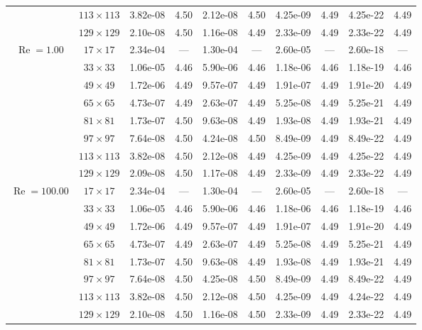\documentclass[preprint, 12pt]{elsarticle}
\begin{document}
{\begin{center}
\begin{table}[H]
{\begin{tabular*}{\textwidth}{@{\extracolsep\fill}cccccccccc@{}}
    & $113\times 113$ & 3.82e-08 & 4.50 & 2.12e-08 & 4.50 & 4.25e-09 & 4.49 & 4.25e-22 & 4.49 \\
    & $129\times 129$ & 2.10e-08 & 4.50 & 1.16e-08 & 4.49 & 2.33e-09 & 4.49 & 2.33e-22 & 4.49 \\
    \hline\hline
    \multirow{7}{*}{$\operatorname{Re}=1.00$} & $17\times 17$ & 2.34e-04 & --- & 1.30e-04 & --- & 2.60e-05 & --- & 2.60e-18 & --- \\
    & $33\times 33$ & 1.06e-05 & 4.46 & 5.90e-06 & 4.46 & 1.18e-06 & 4.46 & 1.18e-19 & 4.46 \\
    & $49\times 49$ & 1.72e-06 & 4.49 & 9.57e-07 & 4.49 & 1.91e-07 & 4.49 & 1.91e-20 & 4.49 \\
    \multirow{3}{*}{$\operatorname{Wi}=10$} & $65\times 65$ & 4.73e-07 & 4.49 & 2.63e-07 & 4.49 & 5.25e-08 & 4.49 & 5.25e-21 & 4.49 \\
    & $81\times 81$ & 1.73e-07 & 4.50 & 9.63e-08 & 4.49 & 1.93e-08 & 4.49 & 1.93e-21 & 4.49 \\
    & $97\times 97$ & 7.64e-08 & 4.50 & 4.24e-08 & 4.50 & 8.49e-09 & 4.49 & 8.49e-22 & 4.49 \\
    & $113\times 113$ & 3.82e-08 & 4.50 & 2.12e-08 & 4.49 & 4.25e-09 & 4.49 & 4.25e-22 & 4.49 \\
    & $129\times 129$ & 2.09e-08 & 4.50 & 1.17e-08 & 4.49 & 2.33e-09 & 4.49 & 2.33e-22 & 4.49 \\
    \hline
    \multirow{7}{*}{$\operatorname{Re}=100.00$} & $17\times 17$ & 2.34e-04 & --- & 1.30e-04 & --- & 2.60e-05 & --- & 2.60e-18 & --- \\
    & $33\times 33$ & 1.06e-05 & 4.46 & 5.90e-06 & 4.46 & 1.18e-06 & 4.46 & 1.18e-19 & 4.46 \\
    & $49\times 49$ & 1.72e-06 & 4.49 & 9.57e-07 & 4.49 & 1.91e-07 & 4.49 & 1.91e-20 & 4.49 \\
    \multirow{3}{*}{$\operatorname{Wi}=10$} & $65\times 65$ & 4.73e-07 & 4.49 & 2.63e-07 & 4.49 & 5.25e-08 & 4.49 & 5.25e-21 & 4.49 \\
    & $81\times 81$ & 1.73e-07 & 4.50 & 9.63e-08 & 4.49 & 1.93e-08 & 4.49 & 1.93e-21 & 4.49 \\
    & $97\times 97$ & 7.64e-08 & 4.50 & 4.25e-08 & 4.50 & 8.49e-09 & 4.49 & 8.49e-22 & 4.49 \\
    & $113\times 113$ & 3.82e-08 & 4.50 & 2.12e-08 & 4.50 & 4.25e-09 & 4.49 & 4.24e-22 & 4.49 \\
    & $129\times 129$ & 2.10e-08 & 4.50 & 1.16e-08 & 4.50 & 2.33e-09 & 4.49 & 2.33e-22 & 4.49 \\

\end{tabular*}}
\end{table}
\end{center}}
\end{document}
